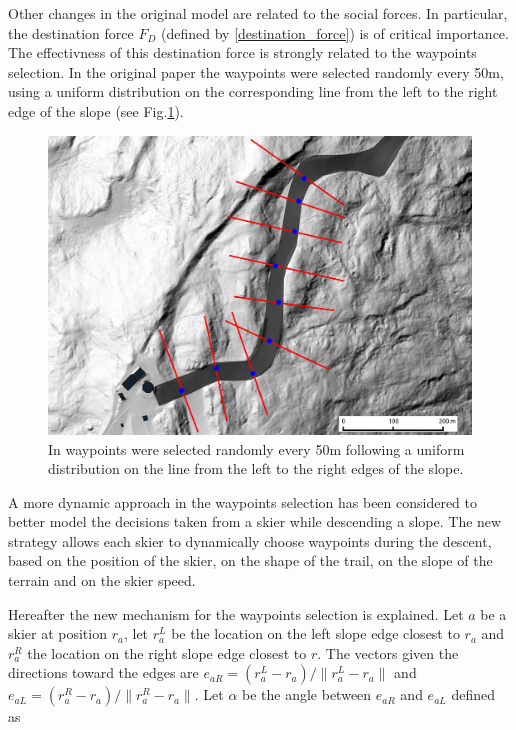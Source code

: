\documentclass[12pt,a4paper,twoside]{book}
\newcommand{\norm}[1]{\lVert#1\rVert}
\begin{document}
Other changes in the original model are related to the social forces. In particular, the destination force $F_D$ (defined by \ref{destination_force}) is of critical importance. The effectivness of this destination force is strongly related to the waypoints selection. In the original paper the waypoints were selected randomly every 50m, using a uniform distribution on the corresponding line from the left to the right edge of the slope (see Fig.\ref{waypoints_old_pic}).

\begin{figure}
  \begin{center}
    \includegraphics[width=\textwidth]{images/waypoint_line.eps}
    \caption{In \cite{hol2012} waypoints were selected randomly every 50m following a uniform distribution on the line from the left to the right edges of the slope.}\label{waypoints_old_pic}
  \end{center}
\end{figure}

A more dynamic approach in the waypoints selection has been considered to better model the decisions taken from a skier while descending a slope. The new strategy allows each skier to dynamically choose waypoints during the descent, based on the position of the skier, on the shape of the trail, on the slope of the terrain and on the skier speed.

Hereafter the new mechanism for the waypoints selection is explained. Let $a$ be a skier at position $r_a$, let $r_a^L$ be the location on the left slope edge closest to $r_a$ and $r_a^R$ the location on the right slope edge closest to $r$. The vectors given the directions toward the edges are $e_{aR}=\left(r_a^L-r_a\right)/\norm{r_a^L-r_a}$ and $e_{aL}=\left(r_a^R-r_a\right)/\norm{r_a^R-r_a}$. Let $\alpha$ be the angle between $e_{aR}$ and $e_{aL}$ defined as
\end{document}
